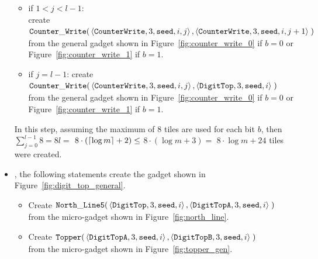 \begin{itemize}
\begin{itemize}
        \item if $1 < j < l-1$:\\ create
        $\begin{aligned}[t]
            \cwrite(&\left\langle {\tt CounterWrite}, 3, {\tt seed}, i, j \right\rangle, \left\langle {\tt CounterWrite}, 3, {\tt seed}, i, j + 1 \right\rangle \;)
        \end{aligned}$\\from the general gadget shown in Figure~\ref{fig:counter_write_0} if $b = 0$ or Figure~\ref{fig:counter_write_1} if $b = 1$.

        \item if $j = l-1$: create
        $\begin{aligned}[t]
            \cwrite(&\left\langle {\tt CounterWrite}, 3, {\tt seed}, i, j \right\rangle, \left\langle {\tt DigitTop}, 3, {\tt seed}, i \right\rangle \;)
        \end{aligned}$\\from the general gadget shown in Figure~\ref{fig:counter_write_0} if $b = 0$ or Figure~\ref{fig:counter_write_1} if $b = 1$.
    \end{itemize}
    In this step, assuming the maximum of 8 tiles are used for each bit $b$, then
    $\sum^{l-1}_{j=0} 8 = 8l =$
    $8 \cdot \left( \ceil*{\log m} + 2 \right) \leq$
    $8 \cdot \left( {\log m} + 3 \right) =$
    $8 \cdot {\log m} + 24$ tiles were created.

    \item {\dtop}, the following statements create the gadget shown in Figure~\ref{fig:digit_top_general}.
    \begin{itemize}
        \item Create
        $\begin{aligned}[t]
            {\tt North\_Line5}(&\left\langle {\tt DigitTop},  3, {\tt seed}, i \right\rangle,
                                \left\langle {\tt DigitTopA}, 3, {\tt seed}, i \right\rangle \;)
        \end{aligned}$\\from the micro-gadget shown in Figure~\ref{fig:north_line}.

        \item Create
        $\begin{aligned}[t]
            {\tt Topper}(&\left\langle {\tt DigitTopA}, 3, {\tt seed}, i \right\rangle,
                          \left\langle {\tt DigitTopB}, 3, {\tt seed}, i \right\rangle \;)
        \end{aligned}$\\from the micro-gadget shown in Figure~\ref{fig:topper_gen}.


\end{itemize}
\end{itemize}
